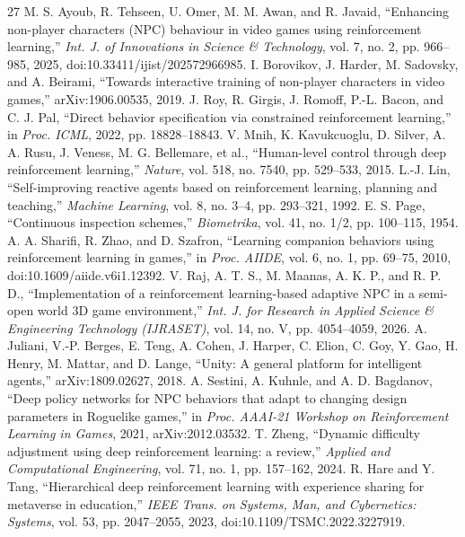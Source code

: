\documentclass[conference,9pt]{IEEEtran}
\begin{document}
\begin{thebibliography}{27}
\footnotesize
\linespread{0.95}\selectfont
\setlength{\itemsep}{0pt}
\setlength{\parsep}{0pt}
 M. S. Ayoub, R. Tehseen, U. Omer, M. M. Awan, and R. Javaid, ``Enhancing non-player characters (NPC) behaviour in video games using reinforcement learning,'' \textit{Int. J. of Innovations in Science \& Technology}, vol. 7, no. 2, pp. 966--985, 2025, doi:10.33411/ijist/202572966985.
 I. Borovikov, J. Harder, M. Sadovsky, and A. Beirami, ``Towards interactive training of non-player characters in video games,'' arXiv:1906.00535, 2019.
 J. Roy, R. Girgis, J. Romoff, P.-L. Bacon, and C. J. Pal, ``Direct behavior specification via constrained reinforcement learning,'' in \textit{Proc. ICML}, 2022, pp. 18828--18843.
 V. Mnih, K. Kavukcuoglu, D. Silver, A. A. Rusu, J. Veness, M. G. Bellemare, et al., ``Human-level control through deep reinforcement learning,'' \textit{Nature}, vol. 518, no. 7540, pp. 529--533, 2015.
 L.-J. Lin, ``Self-improving reactive agents based on reinforcement learning, planning and teaching,'' \textit{Machine Learning}, vol. 8, no. 3--4, pp. 293--321, 1992.
 E. S. Page, ``Continuous inspection schemes,'' \textit{Biometrika}, vol. 41, no. 1/2, pp. 100--115, 1954.
 A. A. Sharifi, R. Zhao, and D. Szafron, ``Learning companion behaviors using reinforcement learning in games,'' in \textit{Proc. AIIDE}, vol. 6, no. 1, pp. 69--75, 2010, doi:10.1609/aiide.v6i1.12392.
 V. Raj, A. T. S., M. Maanas, A. K. P., and R. P. D., ``Implementation of a reinforcement learning-based adaptive NPC in a semi-open world 3D game environment,'' \textit{Int. J. for Research in Applied Science \& Engineering Technology (IJRASET)}, vol. 14, no. V, pp. 4054--4059, 2026.
 A. Juliani, V.-P. Berges, E. Teng, A. Cohen, J. Harper, C. Elion, C. Goy, Y. Gao, H. Henry, M. Mattar, and D. Lange, ``Unity: A general platform for intelligent agents,'' arXiv:1809.02627, 2018.
 A. Sestini, A. Kuhnle, and A. D. Bagdanov, ``Deep policy networks for NPC behaviors that adapt to changing design parameters in Roguelike games,'' in \textit{Proc. AAAI-21 Workshop on Reinforcement Learning in Games}, 2021, arXiv:2012.03532.
 T. Zheng, ``Dynamic difficulty adjustment using deep reinforcement learning: a review,'' \textit{Applied and Computational Engineering}, vol. 71, no. 1, pp. 157--162, 2024.
 R. Hare and Y. Tang, ``Hierarchical deep reinforcement learning with experience sharing for metaverse in education,'' \textit{IEEE Trans. on Systems, Man, and Cybernetics: Systems}, vol. 53, pp. 2047--2055, 2023, doi:10.1109/TSMC.2022.3227919.

\end{thebibliography}
\end{document}
